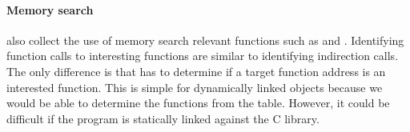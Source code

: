 \paragraph{Memory search}
\libfuzzer also collect the use of memory search relevant functions such as  and . Identifying function calls to interesting functions are similar to identifying indirection calls. The only difference is that \sys has to determine if a target function address is an interested function. This is simple for dynamically linked objects because we would be able to determine the functions from the  table. However, it could be difficult if the program is statically linked against the C library.

